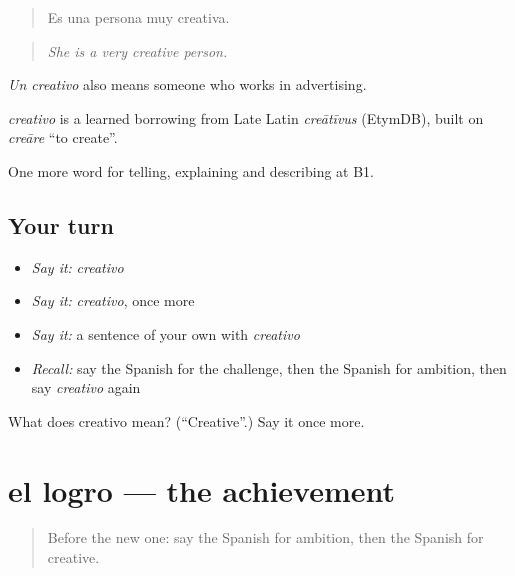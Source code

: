 \begin{quote}
Es una persona muy creativa.
\end{quote}

\begin{quote}
\emph{She is a very creative person.}
\end{quote}

\emph{Un creativo} also means someone who works in advertising.

\begin{cousinweb}
\emph{creativo} is a learned borrowing from Late Latin \emph{creātīvus} (EtymDB), built on \emph{creāre} \textquotedblleft{}to create\textquotedblright{}.
\end{cousinweb}

\begin{grammarlens}[title={What you've built}]
One more word for telling, explaining and describing at B1.
\end{grammarlens}

\subsection*{Your turn}
\begin{itemize}
\raggedright
  \item \emph{Say it:} \emph{creativo}
  \item \emph{Say it:} \emph{creativo}, once more
  \item \emph{Say it:} a sentence of your own with \emph{creativo}
  \item \emph{Recall:} say the Spanish for the challenge, then the Spanish for ambition, then say \emph{creativo} again
\end{itemize}

\begin{tcolorbox}[breakable,colback=teal!4,colframe=teal!35!black,title={Before you move on}]
What does creativo mean? (\textquotedblleft{}Creative\textquotedblright{}.) Say it once more.
\end{tcolorbox}
\section[el logro]{el logro — the achievement}

\label{lesson:ES-C766-logro}



\begin{quote}
Before the new one: say the Spanish for ambition, then the Spanish for creative.
\end{quote}

